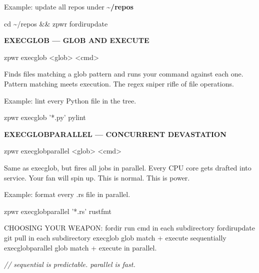 \documentclass[11pt,a4paper,twoside]{book}
\begin{document}
Example: update all repos under \textbf{\textasciitilde{}/repos}

\begin{codebox}
\color{neongreen}cd \textasciitilde{}/repos \&\& zpwr fordirupdate\\
\end{codebox}


\vspace{12pt}
{\bfseries\color{neonyellow} EXECGLOB — GLOB AND EXECUTE}\vspace{4pt}

\begin{codebox}
\color{neongreen}zpwr execglob <glob> <cmd>\\
\end{codebox}

Finds files matching a glob pattern and runs your command against each one. Pattern matching meets execution. The regex sniper rifle of file operations.

Example: lint every Python file in the tree.

\begin{codebox}
\color{neongreen}zpwr execglob '*.py' pylint\\
\end{codebox}


\vspace{12pt}
{\bfseries\color{neonyellow} EXECGLOBPARALLEL — CONCURRENT DEVASTATION}\vspace{4pt}

\begin{codebox}
\color{neongreen}zpwr execglobparallel <glob> <cmd>\\
\end{codebox}

Same as execglob, but fires all jobs in parallel. Every CPU core gets drafted into service. Your fan will spin up. This is normal. This is power.

Example: format every .rs file in parallel.

\begin{codebox}
\color{neongreen}zpwr execglobparallel '*.rs' rustfmt\\
\end{codebox}

CHOOSING YOUR WEAPON: fordir             run cmd in each subdirectory fordirupdate       git pull in each subdirectory execglob           glob match + execute sequentially execglobparallel   glob match + execute in parallel.

{\small\itshape\color{dimtext} // sequential is predictable. parallel is fast.}
\end{document}
